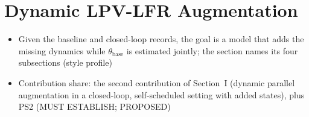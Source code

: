 %
\section{Dynamic LPV-LFR Augmentation}\label{sec:augmentation}
\ifdraft
\begin{itemize}
\item Given the baseline and closed-loop records, the goal is a model that adds the missing dynamics while $\theta_{\mathrm{base}}$ is estimated jointly; the section names its four subsections (style profile)
\item Contribution share: the second contribution of Section~I (dynamic parallel augmentation in a closed-loop, self-scheduled setting with added states), plus PS2 (MUST ESTABLISH; PROPOSED)
\end{itemize}
\fi

